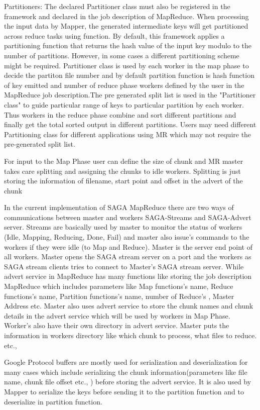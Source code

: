 \documentclass[12pt]{article}
\begin{document}
Partitioners: The declared Partitioner class must also be registered in the framework and declared in the job description of MapReduce. When processing the input data by Mapper, the generated intermediate keys will get partitioned across reduce tasks using function. By default, this framework applies a partitioning function that returns the hash value of the input key modulo to the number of partitions. However, in some cases a different partitioning scheme might be required. Partitioner class is used by each worker in the map phase to decide the partiton file number and by default partition function is hash function of key emitted and number of reduce phase workers defined by the user in the MapReduce job description.The pre generated split list is used in the "Partitioner class" to guide particular range of keys to particular partition by each worker. Thus workers in the reduce phase combine and sort  different partitions and finally get the total sorted output in different partitions. Users may need different Partitioning class for different applications using MR which may not require the pre-generated split list.

For input to the Map Phase user can define the size of chunk and MR master takes care splitting and assigning the chunks to idle workers. Splitting is just storing the information of filename, start point and offset in the advert of the chunk 


In the current implementation of SAGA MapReduce there are two ways of communications between master and workers SAGA-Streams and SAGA-Advert server. Streams are basically used by master to monitor the status of workers (Idle, Mapping, Reducing, Done, Fail) and master also issue's commands to the workers if they were idle (to Map and Reduce). Master is the server end point of all workers. Master opens the SAGA stream server on a port and the workers as SAGA stream clients tries to connect to Master's SAGA stream server. While advert service in MapReduce has many functions like storing the job description MapReduce which includes parameters like Map functions's name,  Reduce functions's name, Partition functions's name,  number of Reduce's , Master Address etc. Master also uses advert service to store the chunk names and chunk details in the advert service which will be used by workers in Map Phase. Worker's also have their own directory in advert service. Master puts the information in workers directory like which chunk to process, what files to reduce. etc.,

Google Protocol buffers are mostly used for serialization and deserialization for many cases which include serializing the chunk information(parameters like file name, chunk file offset etc., ) before storing the advert service. It is also used by Mapper to serialize the keys before sending it to the partition function and to deserialize in partition function.
\end{document}

